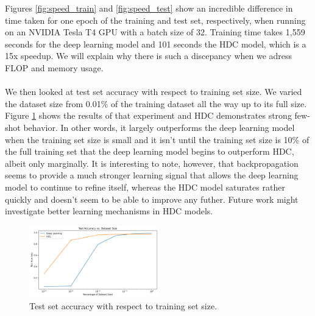 \documentclass[conference]{IEEEtran}
\begin{document}
Figures \ref{fig:speed_train} and \ref{fig:speed_test} show an incredible difference in time taken for one epoch of the training and test set, respectively, when running on an NVIDIA Tesla T4 GPU with a batch size of 32. Training time takes 1,559 seconds for the deep learning model and 101 seconds the HDC model, which is a 15x speedup. We will explain why there is such a discepancy when we adress FLOP and memory usage.\\
\\
We then looked at test set accuracy with respect to training set size. We varied the dataset size from 0.01\% of the training dataset all the way up to its full size. Figure \ref{fig:data_size} shows the results of that experiment and HDC demonstrates strong few-shot behavior. In other words, it largely outperforms the deep learning model when the training set size is small and it isn't until the training set size is 10\% of the full training set that the deep learning model begins to outperform HDC, albeit only marginally. It is interesting to note, however, that backpropagation seems to provide a much stronger learning signal that allows the deep learning model to continue to refine itself, whereas the HDC model saturates rather quickly and doesn't seem to be able to improve any futher. Future work might investigate better learning mechanisms in HDC models.\\

\begin{figure}[htbp]
\centerline{\includegraphics[width=0.5\textwidth]{analysis/data_size.png}}
\caption{Test set accuracy with respect to training set size.}
\label{fig:data_size}
\end{figure}
\end{document}
